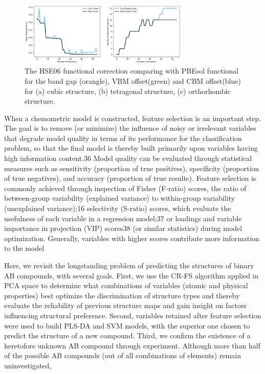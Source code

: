 \documentclass[%
reprint,
superscriptaddress,
citeautoscript,
 amsmath,amssymb,
 aps,
 prl,
floatfix,
]{revtex4-1}
\begin{document}
\begin{figure}[ht]
\begin{center}
\includegraphics[width=3.2in]{Figures/Fig3.png}
\end{center}
\caption{ The HSE06 functional correction comparing with PBEsol functional for the band gap (orangle), VBM offset(green) and CBM offset(blue) for (a) cubic structure, (b) tetragonal structure, (c) orthorhombic structure. 
}
\label{fig3}
\end{figure}
When a chemometric model is constructed, feature selection is an important step. The goal is to remove (or minimize) the influence of noisy or irrelevant variables that degrade model quality in terms of its performance for the classification problem, so that the final model is thereby built primarily upon variables having high information content.36 Model quality can be evaluated through statistical measures such as sensitivity
(proportion of true positives), specificity (proportion of true
negatives), and accuracy (proportion of true results). Feature
selection is commonly achieved through inspection of Fisher
(F-ratio) scores, the ratio of between-group variability
(explained variance) to within-group variability (unexplained
variance);16 selectivity (S-ratio) scores, which evaluate the
usefulness of each variable in a regression model;37 or loadings
and variable importance in projection (VIP) scores38 (or similar
statistics) during model optimization. Generally, variables with
higher scores contribute more information to the model

Here, we revisit the longstanding problem of predicting the
structures of binary AB compounds, with several goals. First, we
use the CR-FS algorithm applied in PCA space to determine
what combinations of variables (atomic and physical properties) best optimize the discrimination of structure types and
thereby evaluate the reliability of previous structure maps and
gain insight on factors influencing structural preference.
Second, variables retained after feature selection were used to
build PLS-DA and SVM models, with the superior one chosen
to predict the structure of a new compound. Third, we confirm
the existence of a heretofore unknown AB compound through
experiment. Although more than half of the possible AB
compounds (out of all combinations of elements) remain
uninvestigated,
\end{document}

